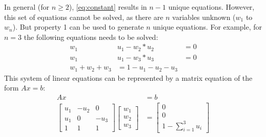 In general (for $n \geq 2$), \autoref{eq:constant} results in $n-1$ unique equations. However, this set of equations cannot be solved, as there are $n$ variables unknown ($w_1$ to $w_n$). But property 1 can be used to generate $n$ unique equations. For example, for $n=3$ the following equations needs to be solved:
\begin{equation}\label{eq:linear3}
    \begin{split}
        w_1 & u_1 - w_2 * u_2 &= 0 \\
        w_1 & u_1 - w_3 * u_3 &= 0 \\
        w_1 + w_2 + w_3 &= 1 - u_1 - u_2 - u_3
    \end{split}
\end{equation}
This system of linear equations can be represented by a matrix equation of the form $Ax = b$:
\begin{equation} \label{eq:matrix}
    \begin{split}
        A x &= b\\
        \begin{bmatrix}
        u_1 & -u_2 & 0    \\
        u_1 & 0    & -u_3 \\
        1   & 1    & 1
        \end{bmatrix}
        \begin{bmatrix}
        w_1 \\ w_2 \\ w_3
        \end{bmatrix}
        &= \begin{bmatrix}0 \\ 0 \\ 1 - \sum_{i=1}^3 u_i\end{bmatrix}
    \end{split}
\end{equation}

